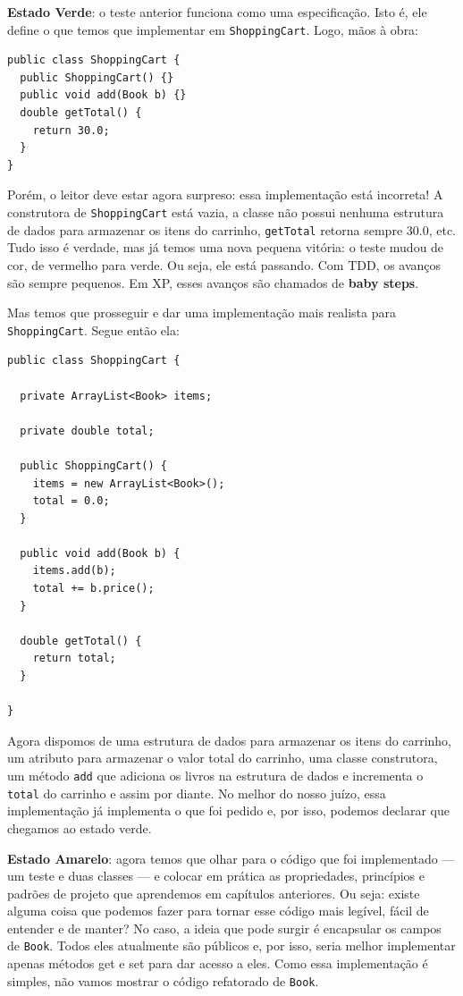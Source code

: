 \documentclass[
  11pt,
  twoside]{book}
\newcommand{\passthrough}[1]{#1}
\begin{document}
\textbf{Estado Verde}: o teste anterior funciona como uma especificação.
Isto é, ele define o que temos que implementar em
\passthrough{\lstinline!ShoppingCart!}. Logo, mãos à obra:

\begin{lstlisting}
public class ShoppingCart {
  public ShoppingCart() {}
  public void add(Book b) {}
  double getTotal() {
    return 30.0;
  }
}
\end{lstlisting}

Porém, o leitor deve estar agora surpreso: essa implementação está
incorreta! A construtora de \passthrough{\lstinline!ShoppingCart!} está
vazia, a classe não possui nenhuma estrutura de dados para armazenar os
itens do carrinho, \passthrough{\lstinline!getTotal!} retorna sempre
30.0, etc. Tudo isso é verdade, mas já temos uma nova pequena vitória: o
teste mudou de cor, de vermelho para verde. Ou seja, ele está passando.
Com TDD, os avanços são sempre pequenos. Em XP, esses avanços são
chamados de \textbf{baby steps}.

Mas temos que prosseguir e dar uma implementação mais realista para
\passthrough{\lstinline!ShoppingCart!}. Segue então ela:

\begin{lstlisting}
public class ShoppingCart {

  private ArrayList<Book> items;

  private double total;

  public ShoppingCart() {
    items = new ArrayList<Book>();  
    total = 0.0;  
  }

  public void add(Book b) {
    items.add(b);
    total += b.price();
  }

  double getTotal() {
    return total;
  }

}
\end{lstlisting}

Agora dispomos de uma estrutura de dados para armazenar os itens do
carrinho, um atributo para armazenar o valor total do carrinho, uma
classe construtora, um método \passthrough{\lstinline!add!} que adiciona
os livros na estrutura de dados e incrementa o
\passthrough{\lstinline!total!} do carrinho e assim por diante. No
melhor do nosso juízo, essa implementação já implementa o que foi pedido
e, por isso, podemos declarar que chegamos ao estado verde.

\textbf{Estado Amarelo}: agora temos que olhar para o código que foi
implementado --- um teste e duas classes --- e colocar em prática as
propriedades, princípios e padrões de projeto que aprendemos em
capítulos anteriores. Ou seja: existe alguma coisa que podemos fazer
para tornar esse código mais legível, fácil de entender e de manter? No
caso, a ideia que pode surgir é encapsular os campos de
\passthrough{\lstinline!Book!}. Todos eles atualmente são públicos e,
por isso, seria melhor implementar apenas métodos get e set para dar
acesso a eles. Como essa implementação é simples, não vamos mostrar o
código refatorado de \passthrough{\lstinline!Book!}.
\end{document}
